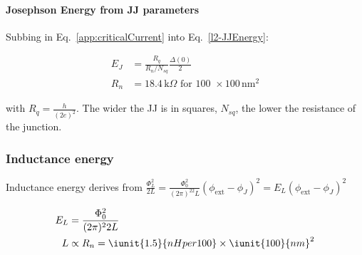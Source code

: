   \begin{framed}\noindent
    \paragraph{Josephson   Energy  from   JJ  parameters}   Subbing  in
    Eq.~\eqref{app:criticalCurrent} into Eq.~\eqref{l2-JJEnergy}:

    \begin{equation}\label{key}
      \begin{aligned}
        E_J & = \frac{R_q}{R_n/N_{sq}}\frac{\Delta(0)}{2}\\
        R_n &= 18.4\,\text{k}\Omega \text{ for 100 } \times 100\,\text{nm}^2
      \end{aligned}
    \end{equation}

    \noindent with $  R_q = \frac{h}{(2e)^2} $. The wider  the JJ is in
    squares, $ N_{sq} $, the lower the resistance of the junction.

  \end{framed}

   \subsubsection{Inductance energy}
   Inductance              energy             derives              from
   $                        \frac{\Phi_L^2}{2L}                       =
   \frac{\Phi_0^2}{(2\pi)^22L}(\phi_\text{ext}-\phi_J)^2              =
   E_L(\phi_\text{ext}-\phi_J)^2 $

   \begin{equation}
     \begin{aligned}
       E_L & = \frac{\Phi_0^2}{(2\pi)^22L}\\
       L & \propto R_n = \iunit{1.5}{nH per 100}\times\iunit{100}{nm}^2
     \end{aligned}
   \end{equation}


